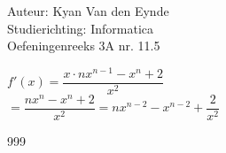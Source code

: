 \documentclass[a4paper]{article}
\begin{document}
  
\noindent \large Auteur: Kyan Van den Eynde \\
\noindent \large Studierichting: Informatica\\
\noindent \large Oefeningenreeks 3A nr. 11.5\\

\medskip

\normalsize

$f'(x) = \dfrac{x \cdot nx^{n-1} - x^n + 2}{x^2}$\\

$= \dfrac{nx^n-x^n+2}{x^2} = nx^{n-2}-x^{n-2} + \dfrac{2}{x^2}$\\

\begin{thebibliography}{999}
\end{thebibliography}
\end{document}
